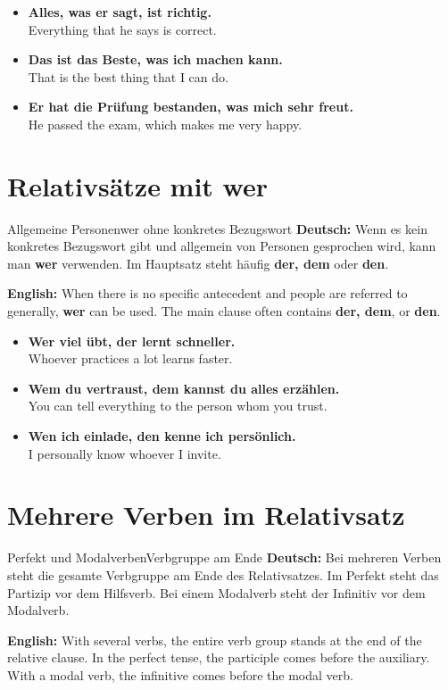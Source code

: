 \documentclass[a4paper,11pt]{article}
\newcommand{\GermanText}[1]{\textbf{Deutsch: }#1\par}
\newcommand{\EnglishText}[1]{{\small\color{SoftGray}\textbf{English: }#1\par}}
\newcommand{\ExampleItem}[2]{\item \textbf{#1}\\{\small\color{SoftGray}#2}}
\begin{document}
        \begin{exbox}
            \begin{itemize}
                \ExampleItem{Alles, was er sagt, ist richtig.}{Everything that he says is correct.}
                \ExampleItem{Das ist das Beste, was ich machen kann.}{That is the best thing that I can do.}
                \ExampleItem{Er hat die Prüfung bestanden, was mich sehr freut.}{He passed the exam, which makes me very happy.}
            \end{itemize}
        \end{exbox}

    \section{Relativsätze mit \glqq wer\grqq}

        \begin{grammarentry}{Allgemeine Personen}{wer ohne konkretes Bezugswort}
            \GermanText{Wenn es kein konkretes Bezugswort gibt und allgemein von Personen gesprochen wird, kann man \textbf{wer} verwenden. Im Hauptsatz steht häufig \textbf{der, dem} oder \textbf{den}.}
            \EnglishText{When there is no specific antecedent and people are referred to generally, \textbf{wer} can be used. The main clause often contains \textbf{der, dem}, or \textbf{den}.}
        \end{grammarentry}

        \begin{exbox}
            \begin{itemize}
                \ExampleItem{Wer viel übt, der lernt schneller.}{Whoever practices a lot learns faster.}
                \ExampleItem{Wem du vertraust, dem kannst du alles erzählen.}{You can tell everything to the person whom you trust.}
                \ExampleItem{Wen ich einlade, den kenne ich persönlich.}{I personally know whoever I invite.}
            \end{itemize}
        \end{exbox}

    \section{Mehrere Verben im Relativsatz}

        \begin{grammarentry}{Perfekt und Modalverben}{Verbgruppe am Ende}
            \GermanText{Bei mehreren Verben steht die gesamte Verbgruppe am Ende des Relativsatzes. Im Perfekt steht das Partizip vor dem Hilfsverb. Bei einem Modalverb steht der Infinitiv vor dem Modalverb.}
            \EnglishText{With several verbs, the entire verb group stands at the end of the relative clause. In the perfect tense, the participle comes before the auxiliary. With a modal verb, the infinitive comes before the modal verb.}
        \end{grammarentry}
\end{document}
